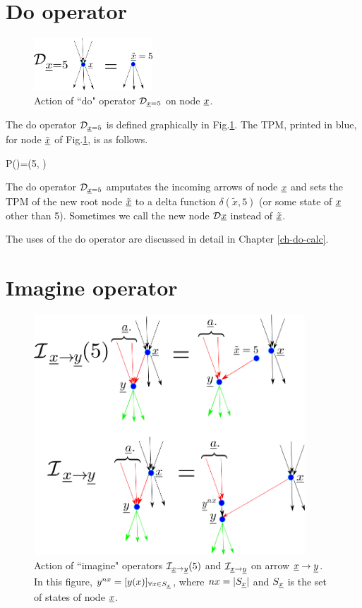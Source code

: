 \section{Do operator}


\begin{figure}[h!]
\centering
\includegraphics[width=1.75in]
{counterf/rho-op.png}
\caption{Action
of ``do" operator ${\cal D}_{{\underline{x}}=5}$
on node ${\underline{x}}$.} 
\label{fig-rho-op}
\end{figure}

The do operator ${\cal D}_{{\underline{x}}=5}$
is defined graphically in Fig.\ref{fig-rho-op}.
The TPM, printed in blue,
 for node $\tilde{{\underline{x}}}$ of Fig.\ref{fig-rho-op},
is as follows.

\beq\color{blue}
P()=\delta(5, )
\eeq


The do operator ${\cal D}_{{\underline{x}}=5}$
amputates
the incoming arrows of node ${\underline{x}}$
and sets the TPM
of the new root node $\tilde{{\underline{x}}}$
to a delta function $\delta(
\tilde{x}, 5)$
(or some state of ${\underline{x}}$
 other than 5).
Sometimes we call the new node
${\cal D}{\underline{x}}$
instead of 
$\tilde{{\underline{x}}}$.

The uses of the do operator are discussed
in detail in Chapter \ref{ch-do-calc}.

\section{Imagine operator}

\begin{figure}[h!]
\centering
\includegraphics[width=4in]
{counterf/kappa.png}
\caption{Action of ``imagine" operators 
${\cal I}_{{\underline{x}}\rightarrow {\underline{y}}}(5)$
and ${\cal I}_{{\underline{x}}\rightarrow {\underline{y}}}$
on arrow ${\underline{x}}\rightarrow {\underline{y}}$.
In this figure, $y^{nx}=[y(x)]_{\forall x\in S_{\underline{x}}}$,
where $nx=|S_{\underline{x}}|$
and $S_{\underline{x}}$ is the set of states of node ${\underline{x}}$.
} 
\label{fig-kappa}
\end{figure}

